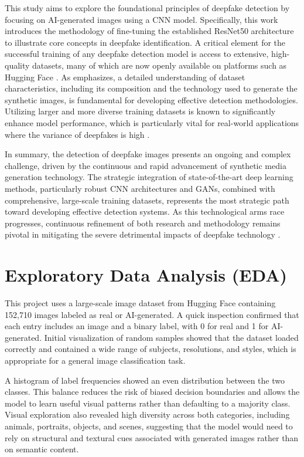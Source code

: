 \documentclass[man,12pt,letterpaper,donotrepeattitle,floatsintext]{apa7}
\begin{document}
This study aims to explore the foundational principles of deepfake detection by 
focusing on AI-generated images using a CNN model. Specifically, this work introduces 
the methodology of fine-tuning the established ResNet50 architecture \citep{He2016} to 
illustrate core concepts in deepfake identification. A critical element for the successful 
training of any deepfake detection model is access to extensive, high-quality datasets, 
many of which are now openly available on platforms such as Hugging Face \citep{HuggingFace}. 
As \cite{Berrahal2023} emphasizes, a detailed understanding of dataset characteristics, 
including its composition and the technology used to generate the synthetic images, 
is fundamental for developing effective detection methodologies. Utilizing larger and 
more diverse training datasets is known to significantly enhance model performance, 
which is particularly vital for real-world applications where the variance of 
deepfakes is high \citep{Frid-Adar2018, Golilarz2024}.

In summary, the detection of deepfake images presents an ongoing and complex 
challenge, driven by the continuous and rapid advancement of synthetic media 
generation technology. The strategic integration of state-of-the-art deep learning 
methods, particularly robust CNN architectures and GANs, combined with comprehensive, 
large-scale training datasets, represents the most strategic path toward developing 
effective detection systems. As this technological arms race progresses, continuous 
refinement of both research and methodology remains pivotal in mitigating the severe 
detrimental impacts of deepfake technology \citep{Berrahal2023, Haseena2023}.


\section{Exploratory Data Analysis (EDA)}
\label{eda}
This project uses a large-scale image dataset from Hugging Face containing 152,710 
images labeled as real or AI-generated. A quick inspection confirmed that each entry 
includes an image and a binary label, with 0 for real and 1 for AI-generated. Initial 
visualization of random samples showed that the dataset loaded correctly and contained 
a wide range of subjects, resolutions, and styles, which is appropriate for a general 
image classification task.

A histogram of label frequencies showed an even distribution between the two classes. 
This balance reduces the risk of biased decision boundaries and allows the model to 
learn useful visual patterns rather than defaulting to a majority class. Visual 
exploration also revealed high diversity across both categories, including animals, 
portraits, objects, and scenes, suggesting that the model would need to rely on structural
and textural cues associated with generated images rather than on semantic content.
\end{document}
